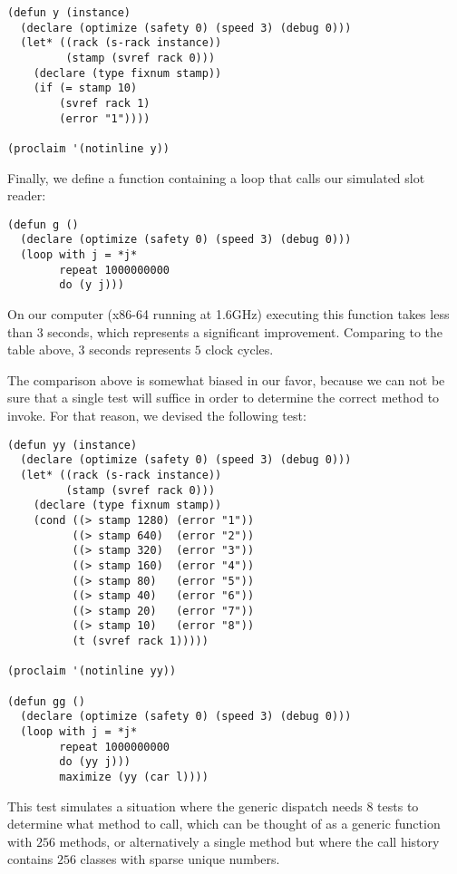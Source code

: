 \begin{verbatim}
(defun y (instance)
  (declare (optimize (safety 0) (speed 3) (debug 0)))
  (let* ((rack (s-rack instance))
         (stamp (svref rack 0)))
    (declare (type fixnum stamp))
    (if (= stamp 10)
        (svref rack 1)
        (error "1"))))

(proclaim '(notinline y))
\end{verbatim}

Finally, we define a function containing a loop that calls our
simulated slot reader:

\begin{verbatim}
(defun g ()
  (declare (optimize (safety 0) (speed 3) (debug 0)))
  (loop with j = *j*
        repeat 1000000000
        do (y j)))
\end{verbatim}

On our computer (x86-64 running at 1.6GHz) executing this function
takes less than $3$ seconds, which represents a significant
improvement.  Comparing to the table above, $3$ seconds represents $5$
clock cycles. 

The comparison above is somewhat biased in our favor, because we can
not be sure that a single test will suffice in order to determine the
correct method to invoke.  For that reason, we devised the following
test: 

\begin{verbatim}
(defun yy (instance)
  (declare (optimize (safety 0) (speed 3) (debug 0)))
  (let* ((rack (s-rack instance))
         (stamp (svref rack 0)))
    (declare (type fixnum stamp))
    (cond ((> stamp 1280) (error "1"))
          ((> stamp 640)  (error "2"))
          ((> stamp 320)  (error "3"))
          ((> stamp 160)  (error "4"))
          ((> stamp 80)   (error "5"))
          ((> stamp 40)   (error "6"))
          ((> stamp 20)   (error "7"))
          ((> stamp 10)   (error "8"))
          (t (svref rack 1)))))

(proclaim '(notinline yy))

(defun gg ()
  (declare (optimize (safety 0) (speed 3) (debug 0)))
  (loop with j = *j*
        repeat 1000000000
        do (yy j)))
        maximize (yy (car l))))
\end{verbatim}

This test simulates a situation where the generic dispatch needs $8$
tests to determine what method to call, which can be thought of as a
generic function with $256$ methods, or alternatively a single method
but where the call history contains $256$ classes with sparse unique
numbers. 

